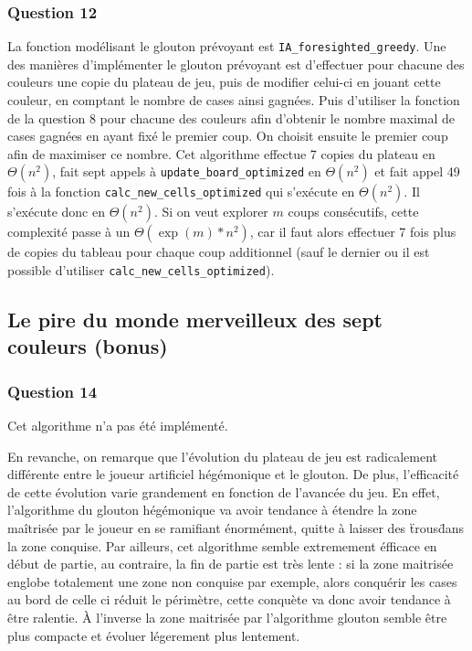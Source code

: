 \documentclass[12pt,a4paper,twoside]{article}
\begin{document}
\subsubsection*{Question 12}
\label{sec:orgheadline21}
La fonction modélisant le glouton prévoyant est
\texttt{IA\_foresighted\_greedy}. 
Une des manières d'implémenter le glouton prévoyant est d'effectuer
pour chacune des couleurs une copie du plateau de jeu, puis de
modifier celui-ci en jouant cette couleur, en comptant le nombre de
cases ainsi gagnées. Puis d'utiliser la fonction de la question 8 pour
chacune des couleurs afin d'obtenir le nombre maximal de cases gagnées
en ayant fixé le premier coup. On choisit ensuite le premier coup afin
de maximiser ce nombre.  Cet algorithme effectue 7 copies du plateau
en \(\Theta(n^{2})\), fait sept appels à \texttt{update\_board\_optimized} en
\(\Theta(n^{2})\) et fait appel 49 fois à la fonction
\texttt{calc\_new\_cells\_optimized} qui s'exécute en \(\Theta(n^{2})\). Il s'exécute
donc en \(\Theta(n^{2})\).
Si on veut explorer \(m\) coups consécutifs, cette complexité passe à un
\(\Theta(\exp(m)*n^{2})\), car il faut alors effectuer 7 fois plus de copies du
tableau pour chaque coup additionnel (sauf le dernier ou il est possible
d'utiliser \texttt{calc\_new\_cells\_optimized}).

\subsection{Le pire du monde merveilleux des sept couleurs (bonus)}
\label{sec:orgheadline24}
\subsubsection*{Question 14}
\label{sec:orgheadline23}
Cet algorithme n'a pas été implémenté. 

En revanche, on remarque que l'évolution du plateau de jeu est
radicalement différente entre le joueur artificiel hégémonique et le
glouton. De plus, l'efficacité de cette évolution varie grandement en
fonction de l'avancée du jeu.  En effet, l'algorithme du glouton
hégémonique va avoir tendance à étendre la zone maîtrisée par le
joueur en se ramifiant énormément, quitte à laisser des \"trous\" dans
la zone conquise. Par ailleurs, cet algorithme semble extremement
éfficace en début de partie, au contraire, la fin de partie est très
lente : si la zone maitrisée englobe totalement une zone non conquise
par exemple, alors conquérir les cases au bord de celle ci réduit le
périmètre, cette conquète va donc avoir tendance à être ralentie.  À
l'inverse la zone maitrisée par l'algorithme glouton semble être plus
compacte et évoluer légerement plus lentement.
\end{document}

